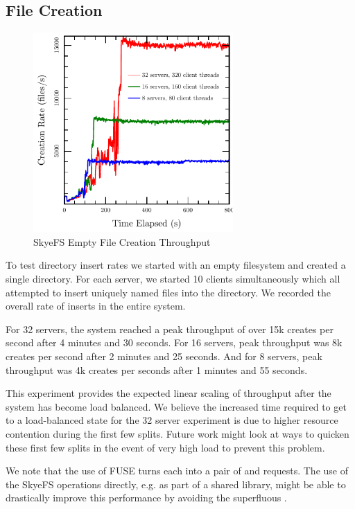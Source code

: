 \documentclass[onecolumn, 11pt, letterpaper]{article}
\begin{document}
\subsection{File Creation}
\begin{figure}
\begin{center}
\includegraphics[width=3in]{graph-create}
\end{center}
\caption{SkyeFS Empty File Creation Throughput}
\end{figure}

To test directory insert rates we started with an empty filesystem and created
a single directory.  For each server, we started 10 clients simultaneously
which all attempted to insert uniquely named files into the directory.  We
recorded the overall rate of inserts in the entire system.

For 32 servers, the system reached a peak throughput of over 15k creates per second
after 4 minutes and 30 seconds.  For 16 servers, peak throughput was 8k
creates per second after 2 minutes and 25 seconds.  And for 8 servers, peak
throughput was 4k creates per seconds after 1 minutes and 55 seconds.

This experiment provides the expected linear scaling of throughput after the
system has become load balanced.  We believe the increased time required to
get to a load-balanced state for the 32 server experiment is due to higher
resource contention during the first few splits.  Future work might look at
ways to quicken these first few splits in the event of very high load to
prevent this problem.

We note that the use of FUSE turns each  into a pair of
 and  requests.  The use of the SkyeFS operations
directly, e.g. as part of a shared library, might be able to drastically
improve this performance by avoiding the superfluous .
\end{document}
